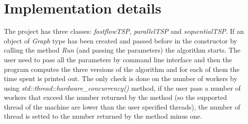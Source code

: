\section{Implementation details}
The project has three classes: \textit{fastflowTSP}, \textit{parallelTSP} and \textit{sequentialTSP}. If an object of \textit{Graph} type has been created and passed before in the constructor by calling the method \textit{Run} (and passing the parameters) the  algorithm starts. The user need to pass all the parameters by command line interface and then the program computes the three versions of the algorithm and for each of them the time spent is printed out. The only check is done on the number of workers by using \textit{std::thread::hardware\_concurrency()} method, if the user pass a number of workers that exceed the number returned by the method (so the supported thread of the machine are lower than the user specified threads), the number of thread is setted to the number returned by the method minus one. 